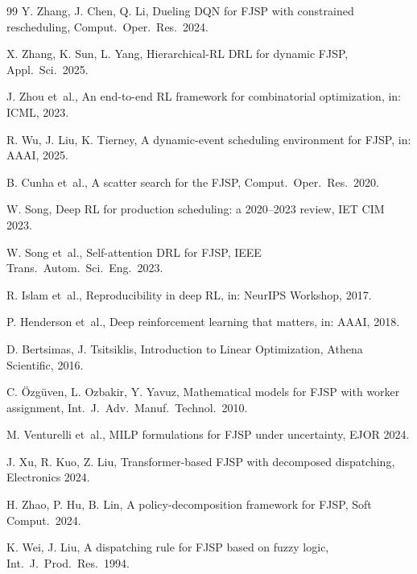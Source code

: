 \documentclass[preprint,review,3p,times,twocolumn]{elsarticle}
\newcommand{\etal}{et~al.\!}
\begin{document}
\begin{thebibliography}{99}
Y. Zhang, J. Chen, Q. Li, Dueling DQN for FJSP with
constrained rescheduling, Comput.\ Oper.\ Res.\ 2024.

X. Zhang, K. Sun, L. Yang, Hierarchical-RL DRL for
dynamic FJSP, Appl.\ Sci.\ 2025.

J. Zhou \etal, An end-to-end RL framework for
combinatorial optimization, in: ICML, 2023.

R. Wu, J. Liu, K. Tierney, A dynamic-event scheduling
environment for FJSP, in: AAAI, 2025.

B. Cunha \etal, A scatter search for the FJSP, Comput.\
Oper.\ Res.\ 2020.

W. Song, Deep RL for production scheduling: a 2020--2023
review, IET CIM 2023.

W. Song \etal, Self-attention DRL for FJSP, IEEE
Trans.\ Autom.\ Sci.\ Eng.\ 2023.

R. Islam \etal, Reproducibility in deep RL, in: NeurIPS
Workshop, 2017.

P. Henderson \etal, Deep reinforcement learning that
matters, in: AAAI, 2018.

D. Bertsimas, J. Tsitsiklis, Introduction to Linear
Optimization, Athena Scientific, 2016.

C. \"Ozg\"uven, L. Ozbakir, Y. Yavuz, Mathematical
models for FJSP with worker assignment, Int.\ J.\ Adv.\
Manuf.\ Technol.\ 2010.

M. Venturelli \etal, MILP formulations for FJSP under
uncertainty, EJOR 2024.

J. Xu, R. Kuo, Z. Liu, Transformer-based FJSP with
decomposed dispatching, Electronics 2024.

H. Zhao, P. Hu, B. Lin, A policy-decomposition framework
for FJSP, Soft Comput.\ 2024.

K. Wei, J. Liu, A dispatching rule for FJSP based on
fuzzy logic, Int.\ J.\ Prod.\ Res.\ 1994.

\end{thebibliography}
\end{document}
